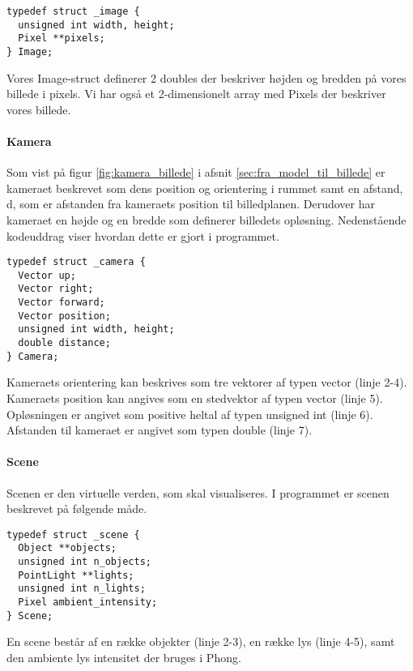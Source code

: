 \begin{lstlisting}[style=Cstyle, caption=Struct til Image]
typedef struct _image {
  unsigned int width, height;
  Pixel **pixels;
} Image;
\end{lstlisting}

Vores Image-struct definerer 2 doubles der beskriver højden og bredden på vores billede i pixels.
Vi har også et 2-dimensionelt array med Pixels der beskriver vores billede.

\paragraph{Kamera}
Som vist på figur \ref{fig:kamera_billede} i afsnit \ref{sec:fra_model_til_billede} er kameraet beskrevet som dens position og orientering i rummet samt en afstand, d, som er afstanden fra kameraets position til billedplanen. Derudover har kameraet en højde og en bredde som definerer billedets opløsning. Nedenstående kodeuddrag viser hvordan dette er gjort i programmet.

\begin{lstlisting}[style=Cstyle, caption=Struct til kamera]
typedef struct _camera {
  Vector up;
  Vector right;
  Vector forward;
  Vector position;
  unsigned int width, height;
  double distance;
} Camera;
\end{lstlisting}

Kameraets orientering kan beskrives som tre vektorer af typen vector (linje 2-4). Kameraets position kan angives som en stedvektor af typen vector (linje 5). Opløsningen er angivet som positive heltal af typen unsigned int (linje 6). Afstanden til kameraet er angivet som typen double (linje 7).

\paragraph{Scene}
Scenen er den virtuelle verden, som skal visualiseres. I programmet er scenen beskrevet på følgende måde. 

\begin{lstlisting}[style=Cstyle, caption=Struct til scene]
typedef struct _scene {
  Object **objects;
  unsigned int n_objects;
  PointLight **lights;
  unsigned int n_lights;
  Pixel ambient_intensity;
} Scene; 
\end{lstlisting}

En scene består af en række objekter (linje 2-3), en række lys (linje 4-5), samt den ambiente lys intensitet der bruges i Phong.

